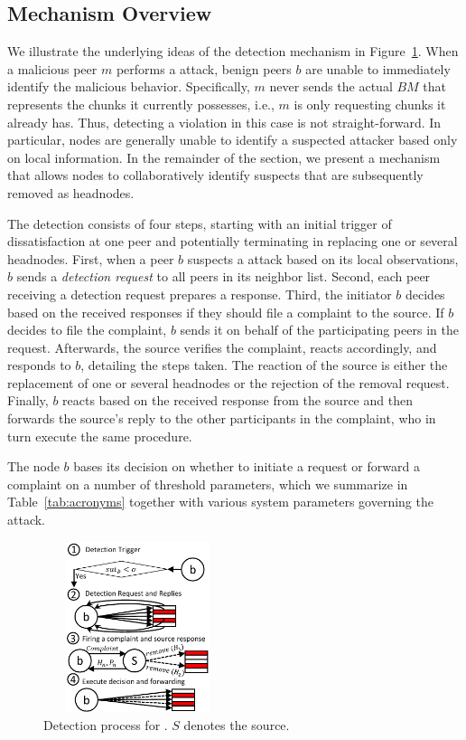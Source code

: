 \subsection{Mechanism Overview}
We illustrate the underlying ideas of the detection mechanism in Figure~\ref{detection-blocks}.
When a malicious peer $m$ performs a \drop attack, benign peers $b$ are unable to immediately identify the malicious behavior.
Specifically, $m$ never sends the actual $BM$ that represents the chunks it currently possesses, i.e., $m$ is only requesting chunks it already has. 
Thus, detecting a violation in this case is not straight-forward. In particular, nodes are generally unable to identify a suspected attacker based only on local information.
In the remainder of the section, we present a mechanism that allows nodes to collaboratively identify suspects that are subsequently removed as headnodes.  


The detection consists of four steps, starting with an initial trigger of dissatisfaction at one peer and potentially terminating in replacing one or several headnodes. 
First, when a peer $b$ suspects a \drop attack based on its local observations, $b$ sends a \emph{detection request} to all peers in its neighbor list.
Second, each peer receiving a detection request prepares a response. 
Third, the initiator $b$ decides based on the received responses if they should file a complaint to the source. 
If $b$ decides to file the complaint, $b$ sends it on behalf of the participating peers in the request. 
Afterwards, the source verifies the complaint, reacts accordingly, and responds to $b$, detailing the steps taken. 
The reaction of the source is either the replacement of one or several headnodes or the rejection of the removal request.
Finally, $b$ reacts based on the received response from the source and then forwards the source's reply to the other participants in the complaint, who in turn execute the same procedure.

The node $b$ bases its decision on whether to initiate a request or forward a complaint on a number of threshold parameters, which we summarize in Table~\ref{tab:acronyms} together with various system parameters governing the attack. 




\begin{figure}
 \centering
 \includegraphics[width=5.5cm,height=5cm]{./Figures/detection.pdf}
 
  \caption{Detection process for \drop. $S$ denotes the source.}
  \vspace{-4.5mm}
\label{detection-blocks} 
\end{figure}


